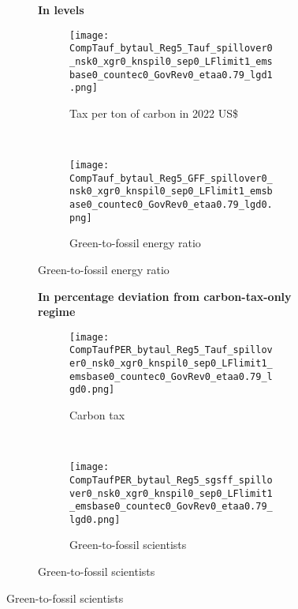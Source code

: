 \begin{figure}[h!!]
	\centering
	\caption{Meeting the emission limit with and without preexisting labor tax }\label{fig:Limit_nsk0_xgr0_know}
	\begin{subfigure}[]{1\textwidth}
		\centering\footnotesize{\textbf{In levels}}\\ \vspace{2mm}
		\begin{subfigure}[]{0.4\textwidth}
			\caption{Tax per ton of carbon in 2022 US\$}
			\texttt{[image: CompTauf\_bytaul\_Reg5\_Tauf\_spillover0\_nsk0\_xgr0\_knspil0\_sep0\_LFlimit1\_emsbase0\_countec0\_GovRev0\_etaa0.79\_lgd1.png]}
		\end{subfigure}	
		\begin{minipage}[]{0.1\textwidth}
			\
		\end{minipage}
		\begin{subfigure}[]{0.4\textwidth}
			\caption{Green-to-fossil energy ratio}
			\texttt{[image: CompTauf\_bytaul\_Reg5\_GFF\_spillover0\_nsk0\_xgr0\_knspil0\_sep0\_LFlimit1\_emsbase0\_countec0\_GovRev0\_etaa0.79\_lgd0.png]}
		\end{subfigure}	 
	\end{subfigure}		
	
	\vspace{3mm}
	\begin{subfigure}[]{1\textwidth}
		\centering\footnotesize{\textbf{In percentage deviation from carbon-tax-only regime}}\\ \vspace{2mm}
		\begin{subfigure}[]{0.4\textwidth}
			\caption{Carbon tax}
			\texttt{[image: CompTaufPER\_bytaul\_Reg5\_Tauf\_spillover0\_nsk0\_xgr0\_knspil0\_sep0\_LFlimit1\_emsbase0\_countec0\_GovRev0\_etaa0.79\_lgd0.png]} 
		\end{subfigure}
		\begin{minipage}[]{0.1\textwidth}
			\
		\end{minipage}
		\begin{subfigure}[]{0.4\textwidth}
			\caption{Green-to-fossil scientists}
			\texttt{[image: CompTaufPER\_bytaul\_Reg5\_sgsff\_spillover0\_nsk0\_xgr0\_knspil0\_sep0\_LFlimit1\_emsbase0\_countec0\_GovRev0\_etaa0.79\_lgd0.png]} 
		\end{subfigure}		
	\end{subfigure}			
\end{figure} 


